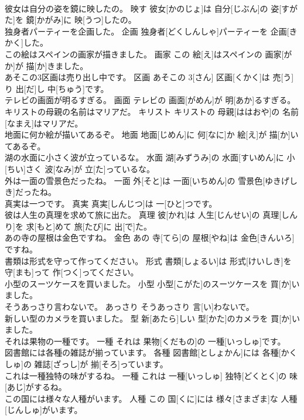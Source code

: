 \documentclass[8pt]{extreport}
\begin{document}
\begin{CJK}{UTF8}{min}
\\	彼女は自分の姿を鏡に映したの。	映す	彼女[かのじょ]は 自分[じぶん]の 姿[すがた]を 鏡[かがみ]に 映[うつ]したの。	
\\	独身者パーティーを企画した。	企画	独身者[どくしんしゃ]パーティーを 企画[きかく]した。	
\\	この絵はスペインの画家が描きました。	画家	この 絵[え]はスペインの 画家[がか]が 描[か]きました。	
\\	あそこの3区画は売り出し中です。	区画	あそこの 3[さん] 区画[くかく]は 売[う]り 出[だ]し 中[ちゅう]です。	
\\	テレビの画面が明るすぎる。	画面	テレビの 画面[がめん]が 明[あか]るすぎる。	
\\	キリストの母親の名前はマリアだ。	キリスト	キリストの 母親[ははおや]の 名前[なまえ]はマリアだ。	
\\	地面に何か絵が描いてあるぞ。	地面	地面[じめん]に 何[なに]か 絵[え]が 描[か]いてあるぞ。	
\\	湖の水面に小さく波が立っているな。	水面	湖[みずうみ]の 水面[すいめん]に 小[ちい]さく 波[なみ]が 立[た]っているな。	
\\	外は一面の雪景色だったね。	一面	外[そと]は 一面[いちめん]の 雪景色[ゆきげしき]だったね。	
\\	真実は一つです。	真実	真実[しんじつ]は 一[ひと]つです。	
\\	彼は人生の真理を求めて旅に出た。	真理	彼[かれ]は 人生[じんせい]の 真理[しんり]を 求[もと]めて 旅[たび]に 出[で]た。	
\\	あの寺の屋根は金色ですね。	金色	あの 寺[てら]の 屋根[やね]は 金色[きんいろ]ですね。	
\\	書類は形式を守って作ってください。	形式	書類[しょるい]は 形式[けいしき]を 守[まも]って 作[つく]ってください。	
\\	小型のスーツケースを買いました。	小型	小型[こがた]のスーツケースを 買[か]いました。	
\\	そうあっさり言わないで。	あっさり	そうあっさり 言[い]わないで。	
\\	新しい型のカメラを買いました。	型	新[あたら]しい 型[かた]のカメラを 買[か]いました。	
\\	それは果物の一種です。	一種	それは 果物[くだもの]の 一種[いっしゅ]です。	
\\	図書館には各種の雑誌が揃っています。	各種	図書館[としょかん]には 各種[かくしゅ]の 雑誌[ざっし]が 揃[そろ]っています。	
\\	これは一種独特の味がするね。	一種	これは 一種[いっしゅ] 独特[どくとく]の 味[あじ]がするね。	
\\	この国には様々な人種がいます。	人種	この 国[くに]には 様々[さまざま]な 人種[じんしゅ]がいます。	

\end{CJK}
\end{document}
